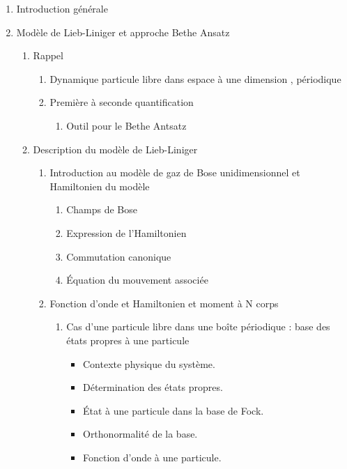 \documentclass[8pt, landscape]{report}
\begin{document}
\begin{multicols}{3} %

\begin{enumerate}
	\item Introduction générale

	\item Modèle de Lieb-Liniger et approche Bethe Ansatz
	
		\begin{enumerate}
			\item Rappel
				\begin{enumerate}
					\item Dynamique particule libre dans espace à une dimension , périodique
					\item Première à seconde quantification
						\begin{enumerate}
							\item Outil pour le Bethe Antsatz
						\end{enumerate}					
				\end{enumerate}
			\item Description du modèle de Lieb-Liniger 
				\begin{enumerate}
					\item Introduction au modèle de gaz de Bose unidimensionnel et Hamiltonien du modèle 
						\begin{enumerate}
							\item Champs de Bose
							\item Expression de l’Hamiltonien
							\item Commutation canonique
							\item Équation du mouvement associée
						\end{enumerate}	
					\item Fonction d’onde et Hamiltonien et moment à N corps
						\begin{enumerate}
							\item Cas d’une particule libre dans une boîte périodique : base des états propres à une particule
								\begin{itemize}
									\item Contexte physique du système.
									\item Détermination des états propres. 
									\item État à une particule dans la base de Fock. 
									\item Orthonormalité de la base. 
									\item Fonction d’onde à une particule.

\end{itemize}
\end{enumerate}
\end{enumerate}
\end{enumerate}
\end{enumerate}
\end{multicols}
\end{document}
